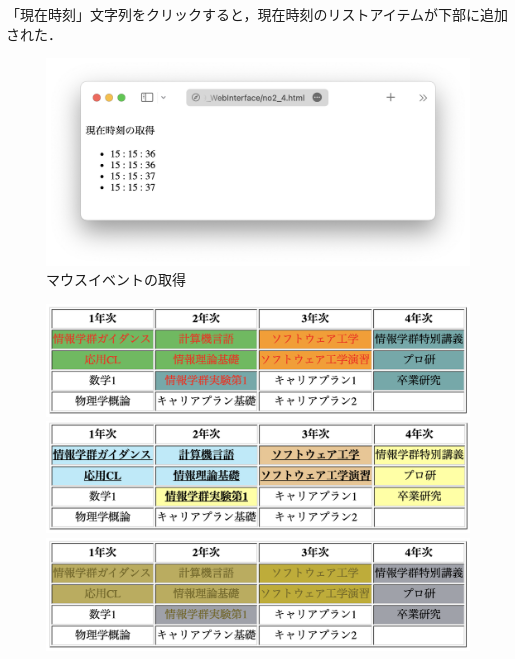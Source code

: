 「現在時刻」文字列をクリックすると，現在時刻のリストアイテムが下部に追加された．
\begin{figure}[H]
    \centering
    \includegraphics[keepaspectratio,width=.6\textwidth]{../../09_WebInterface/no2_4.png}
    \caption{マウスイベントの取得}
\end{figure}
\begin{figure}[H]
    \centering
    \begin{minipage}[b]{.49\columnwidth}
        \centering
        \includegraphics[keepaspectratio,width=\textwidth]{../../10_UniversalDesign/no1_table_original.png}
    \end{minipage}
    \begin{minipage}[b]{.49\columnwidth}
        \centering
        \includegraphics[keepaspectratio,width=\textwidth]{../../10_UniversalDesign/no1_tableR_original.png}
    \end{minipage}
    \begin{minipage}[b]{.49\columnwidth}
        \centering
        \includegraphics[keepaspectratio,width=\textwidth]{../../10_UniversalDesign/no1_table_OC_P.png}

\end{minipage}
\end{figure}
